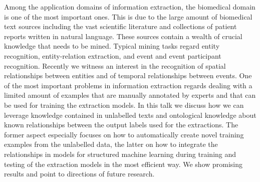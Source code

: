 Among the application domains of information extraction, the biomedical domain is one of the most important ones. This is due to the large amount of biomedical text sources including the vast scientific literature and collections of patient reports written in natural language. These sources contain a wealth of crucial knowledge that needs to be mined. Typical mining tasks regard entity recognition, entity-relation extraction, and event and event participant recognition. Recently we witness an interest in the recognition of spatial relationships between entities and of temporal relationships between events. One of the most important problems in information extraction regards dealing with a limited amount of examples that are manually annotated by experts and that can be used for training the extraction models. In this talk we discuss how we can leverage knowledge contained in unlabelled texts and ontological knowledge about known relationships between the output labels used for the extractions. The former aspect especially focuses on how to automatically create novel training examples from the unlabelled data, the latter on how to integrate the relationships in models for structured machine learning during training and testing of the extraction models in the most efficient way. We show promising results and point to directions of future research.

